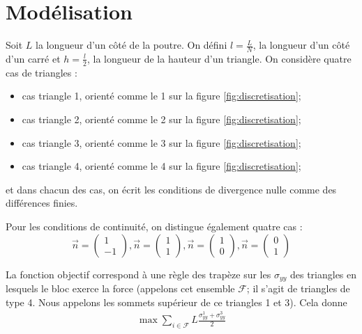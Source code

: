 \newpage
\section{Modélisation}
Soit $L$ la longueur d'un côté de la poutre. On défini $l=\frac{L}{N}$, la longueur d'un côté d'un carré et $h=\frac{l}{2}$, la longueur de la hauteur d'un triangle. On considère quatre cas de triangles : 
\begin{itemize}
\item cas triangle 1, orienté comme le 1 sur la figure \ref{fig:discretisation};
\item cas triangle 2, orienté comme le 2 sur la figure \ref{fig:discretisation};
\item cas triangle 3, orienté comme le 3 sur la figure \ref{fig:discretisation};
\item cas triangle 4, orienté comme le 4 sur la figure \ref{fig:discretisation};
\end{itemize} 
et dans chacun des cas, on écrit les conditions de divergence nulle comme des différences finies. 


Pour les conditions de continuité, on distingue également quatre cas : 
\begin{equation}
\overrightarrow{n} = \begin{pmatrix}
1\\
-1
\end{pmatrix}, 
\overrightarrow{n} = \begin{pmatrix}
1\\
1
\end{pmatrix}, 
\overrightarrow{n} = \begin{pmatrix}
1\\
0
\end{pmatrix},
\overrightarrow{n} = \begin{pmatrix}
0\\
1
\end{pmatrix}
\end{equation}

La fonction objectif correspond à une règle des trapèze sur les $\sigma_{yy}$ des triangles en lesquels le bloc exerce la force (appelons cet ensemble $\mathcal{F}$; il s'agit de triangles de type 4. Nous appelons les sommets supérieur de ce triangles 1 et 3). Cela donne
\begin{align*}
\max \sum_{i \in \mathcal{F}} L \frac{\sigma_{yy}^1 + \sigma_{yy}^3}{2}
\end{align*}

